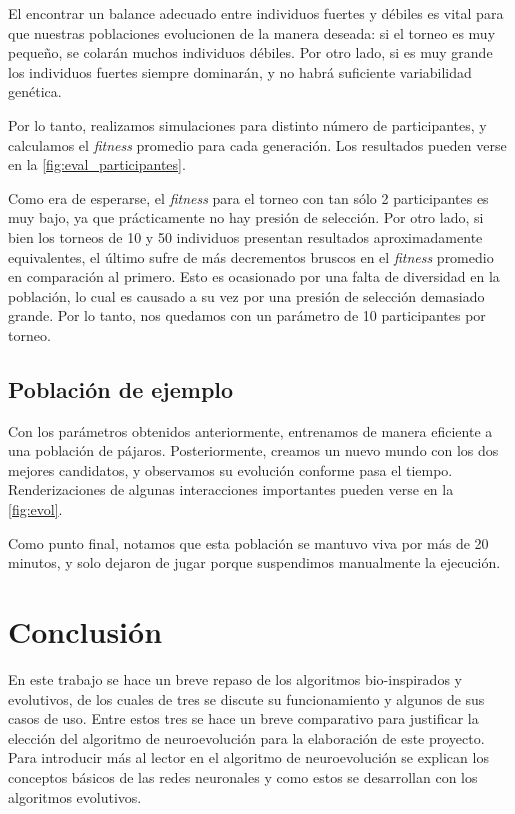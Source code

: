 \documentclass[twocolumn,spanish]{revtex4-1}
\begin{document}
El encontrar un balance adecuado entre individuos fuertes y débiles es vital para que nuestras poblaciones evolucionen de la manera deseada: si el torneo es muy pequeño, se colarán muchos individuos débiles. Por otro lado, si es muy grande los individuos fuertes siempre dominarán, y no habrá suficiente variabilidad genética.

Por lo tanto, realizamos simulaciones para distinto número de participantes, y calculamos el \textit{fitness} promedio para cada generación. Los resultados pueden verse en la \cref{fig:eval_participantes}.

Como era de esperarse, el \textit{fitness} para el torneo con tan sólo 2 participantes es muy bajo, ya que prácticamente no hay presión de selección. Por otro lado, si bien los torneos de 10 y 50 individuos presentan resultados aproximadamente equivalentes, el último sufre de más decrementos bruscos en el \textit{fitness} promedio en comparación al primero. Esto es ocasionado por una falta de diversidad en la población, lo cual es causado a su vez por una presión de selección demasiado grande. Por lo tanto, nos quedamos con un parámetro de 10 participantes por torneo.

\subsection{Población de ejemplo}
Con los parámetros obtenidos anteriormente, entrenamos de manera eficiente a una población de pájaros. Posteriormente, creamos un nuevo mundo con los dos mejores candidatos, y observamos su evolución conforme pasa el tiempo. Renderizaciones de algunas interacciones importantes pueden verse en la \cref{fig:evol}.

Como punto final, notamos que esta población se mantuvo viva por más de 20 minutos, y solo dejaron de jugar porque suspendimos manualmente la ejecución. 

\section{Conclusión}

En este trabajo se hace un breve repaso de los algoritmos bio-inspirados y evolutivos, de los cuales de tres se discute su funcionamiento y algunos de sus casos de uso. Entre estos tres se hace un breve comparativo para justificar la elección del algoritmo de neuroevolución para la elaboración de este proyecto. Para introducir más al lector en el algoritmo de neuroevolución se explican los conceptos básicos de las redes neuronales y como estos se desarrollan con los algoritmos evolutivos.
\end{document}
